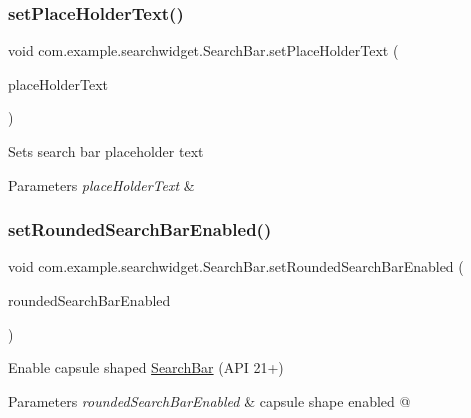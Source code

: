 \subsubsection{\texorpdfstring{setPlaceHolderText()}{setPlaceHolderText()}}
{\footnotesize\ttfamily void com.\+example.\+searchwidget.\+Search\+Bar.\+set\+Place\+Holder\+Text (\begin{DoxyParamCaption}\item[{Char\+Sequence}]{place\+Holder\+Text }\end{DoxyParamCaption})}

Sets search bar placeholder text


\begin{DoxyParams}{Parameters}
{\em place\+Holder\+Text} & \\
\hline
\end{DoxyParams}
\mbox{\label{classcom_1_1example_1_1searchwidget_1_1_search_bar_af2188426a0fd543d09dfcc0042c9cee9}} 
\subsubsection{\texorpdfstring{setRoundedSearchBarEnabled()}{setRoundedSearchBarEnabled()}}
{\footnotesize\ttfamily void com.\+example.\+searchwidget.\+Search\+Bar.\+set\+Rounded\+Search\+Bar\+Enabled (\begin{DoxyParamCaption}\item[{boolean}]{rounded\+Search\+Bar\+Enabled }\end{DoxyParamCaption})}

Enable capsule shaped \mbox{\hyperlink{classcom_1_1example_1_1searchwidget_1_1_search_bar}{Search\+Bar}} (A\+PI 21+)


\begin{DoxyParams}{Parameters}
{\em rounded\+Search\+Bar\+Enabled} & capsule shape enabled @ \\
\hline
\end{DoxyParams}
\mbox{\label{classcom_1_1example_1_1searchwidget_1_1_search_bar_a3f9335e4481de2b5db38735df6b19753}} 
